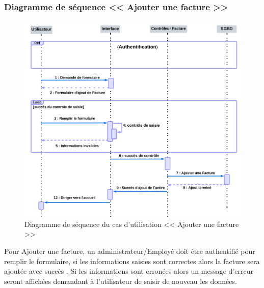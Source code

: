 \documentclass[12pt]{report}
\begin{document}
\subsubsection{Diagramme de séquence << Ajouter une facture >>}
\begin{figure}[H]
  \centering
  \includegraphics[width=18.5cm]{2}
  \caption{ Diagramme de séquence du cas d'utilisation << Ajouter une facture >>}
  \label{fig:votre-label}
\end{figure}
Pour Ajouter une facture, un administrateur/Employé doit être authentifié pour remplir le formulaire, si les informations saisies sont correctes alors la facture sera ajoutée avec succès . Si les informations sont erronées alors un message d'erreur seront affichées demandant à l'utilisateur de saisir de nouveau les données.
\end{document}
